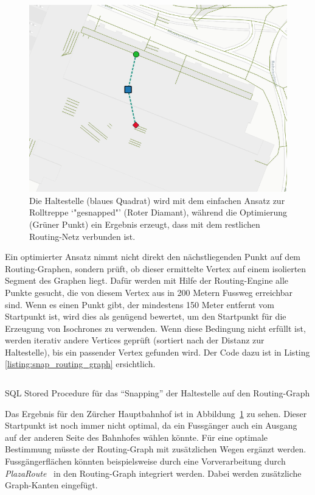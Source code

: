 \begin{figure}[ht]
    \centering
    \includegraphics[width=1\linewidth]{projectdoc/img/snapping_comparison}
    \caption[Snapping der Haltestelle auf den Routing-Graphen]{Die Haltestelle (blaues Quadrat) wird mit dem einfachen Ansatz zur Rolltreppe `"gesnapped"' (Roter Diamant), während die Optimierung (Grüner Punkt) ein Ergebnis erzeugt, dass mit dem restlichen Routing-Netz verbunden ist.}
    \label{fig:snapping_comparison}
\end{figure}

Ein optimierter Ansatz nimmt nicht direkt den nächstliegenden Punkt auf dem Routing-Graphen, sondern prüft, ob dieser ermittelte Vertex auf einem isolierten Segment des Graphen liegt.
Dafür werden mit Hilfe der Routing-Engine alle Punkte gesucht, die von diesem Vertex aus in 200 Metern Fussweg erreichbar sind.
Wenn es einen Punkt gibt, der mindestens 150 Meter entfernt vom Startpunkt ist, wird dies als genügend bewertet, um den Startpunkt für die Erzeugung von \glspl{Isochrone} zu verwenden.
Wenn diese Bedingung nicht erfüllt ist, werden iterativ andere Vertices geprüft (sortiert nach der Distanz zur Haltestelle), bis ein passender Vertex gefunden wird.
Der Code dazu ist in Listing \ref{listing:snap_routing_graph} ersichtlich.

\begin{listing}[ht]
    \inputminted{sql}{projectdoc/listing/nearest_neighbor.sql}
    \caption{SQL Stored Procedure für das "`Snapping"' der Haltestelle auf den Routing-Graph}
    \label{listing:snap_routing_graph}
\end{listing}

Das Ergebnis für den Zürcher Hauptbahnhof ist in Abbildung~\ref{fig:snapping_comparison} zu sehen.
Dieser Startpunkt ist noch immer nicht optimal, da ein Fussgänger auch ein Ausgang auf der anderen Seite des Bahnhofes wählen könnte.
Für eine optimale Bestimmung müsste der Routing-Graph mit zusätzlichen Wegen ergänzt werden.
Fussgängerflächen könnten beispielsweise durch eine Vorverarbeitung durch \emph{PlazaRoute}~\cite{plaza_route} in den Routing-Graph integriert werden. Dabei werden zusätzliche Graph-Kanten eingefügt.

